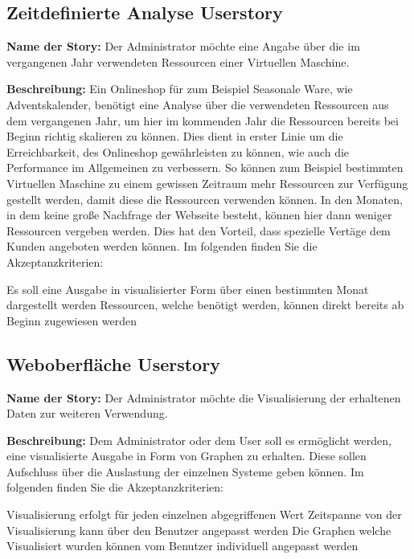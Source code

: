 \subsection{Zeitdefinierte Analyse Userstory}
\textbf{Name der Story:} Der Administrator möchte eine  Angabe über die im
vergangenen Jahr verwendeten Ressourcen einer Virtuellen Maschine.

\textbf{Beschreibung:} Ein Onlineshop für zum Beispiel Seasonale Ware, wie
Adventskalender, benötigt eine Analyse über die verwendeten Ressourcen aus dem
vergangenen Jahr, um hier im kommenden Jahr die Ressourcen bereits bei Beginn
richtig skalieren zu können. Dies dient in erster Linie um die Erreichbarkeit,
des Onlineshop gewährleisten zu können, wie auch die Performance im Allgemeinen
zu verbessern. So können zum Beispiel bestimmten Virtuellen Maschine zu einem
gewissen Zeitraum mehr Ressourcen zur Verfügung gestellt werden, damit diese
die Ressourcen verwenden können. In den Monaten, in dem keine große Nachfrage
der Webseite besteht, können hier dann weniger Ressourcen vergeben werden. Dies
hat den Vorteil, dass spezielle Vertäge dem Kunden angeboten werden können. Im
folgenden finden Sie die Akzeptanzkriterien:

\begin{outline}
  \1 Es soll eine Ausgabe in visualisierter Form über einen bestimmten Monat
  dargestellt werden
  \1 Ressourcen, welche benötigt werden, können direkt bereits ab Beginn
  zugewiesen werden
\end{outline}
\mr%

\subsection{Weboberfläche Userstory}
\textbf{Name der Story:} Der Administrator möchte die Visualisierung der
erhaltenen Daten zur weiteren Verwendung.

\textbf{Beschreibung:} Dem Administrator oder dem User soll es ermöglicht
werden, eine visualisierte Ausgabe in Form von Graphen zu erhalten. Diese
sollen Aufschluss über die Auslastung der einzelnen Systeme geben können. Im
folgenden finden Sie die Akzeptanzkriterien:

\begin{outline}
  \1 Visualisierung erfolgt für jeden einzelnen abgegriffenen Wert
  \1 Zeitspanne von der Visualisierung kann über den Benutzer angepasst werden
  \1 Die Graphen welche Visualisiert wurden können vom Benutzer individuell
  angepasst werden
\end{outline}
\mr%

